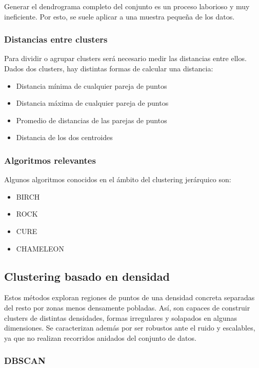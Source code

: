 \documentclass[a4paper,11pt,spanish]{report}
\let\stdsub\subsection
\let\stdsubsub\subsubsection
\renewcommand{\section}{\stdsub}
\renewcommand{\subsection}{\stdsubsub}
\begin{document}
Generar el dendrograma completo del conjunto es un proceso laborioso y muy ineficiente. Por esto, se suele aplicar a una muestra pequeña de los datos.


\subsection*{Distancias entre clusters}
\label{sec-1-3-2-4}

Para dividir o agrupar clusters será necesario medir las distancias entre ellos. Dados dos clusters, hay distintas formas de calcular una distancia:
\begin{itemize}
\item Distancia mínima de  cualquier pareja de puntos
\item Distancia máxima de cualquier pareja de puntos
\item Promedio de distancias de las parejas de puntos
\item Distancia de los dos centroides
\end{itemize}

\subsection*{Algoritmos relevantes}
\label{sec-1-3-2-5}

Algunos algoritmos conocidos en el ámbito del clustering jerárquico son:
\begin{itemize}
\item BIRCH
\item ROCK
\item CURE
\item CHAMELEON
\end{itemize}

\section{Clustering basado en densidad}
\label{sec-1-3-3}

Estos métodos exploran regiones de puntos de una densidad concreta separadas del resto por zonas menos densamente pobladas. Así, son capaces de construir clusters de distintas densidades, formas irregulares y solapados en algunas dimensiones. Se caracterizan además por ser robustos ante el ruido y escalables, ya que no realizan recorridos anidados del conjunto de datos.

\subsection*{DBSCAN}
\label{sec-1-3-3-1}
\end{document}
